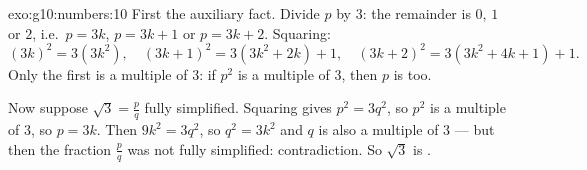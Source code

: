 \begin{solution}{exo:g10:numbers:10}
First the auxiliary fact. Divide $p$ by $3$: the remainder is $0$, $1$ or
$2$, i.e.\ $p = 3k$, $p = 3k+1$ or $p = 3k+2$. Squaring:
\[
(3k)^2 = 3(3k^2), \quad
(3k+1)^2 = 3(3k^2 + 2k) + 1, \quad
(3k+2)^2 = 3(3k^2 + 4k + 1) + 1 .
\]
Only the first is a multiple of $3$: if $p^2$ is a multiple of $3$, then
$p$ is too.

Now suppose $\sqrt3 = \frac pq$ fully simplified. Squaring gives
$p^2 = 3q^2$, so $p^2$ is a multiple of $3$, so $p = 3k$. Then
$9k^2 = 3q^2$, so $q^2 = 3k^2$ and $q$ is also a multiple of $3$ --- but
then the fraction $\frac pq$ was not fully simplified: contradiction. So
$\sqrt3$ is .
\end{solution}
